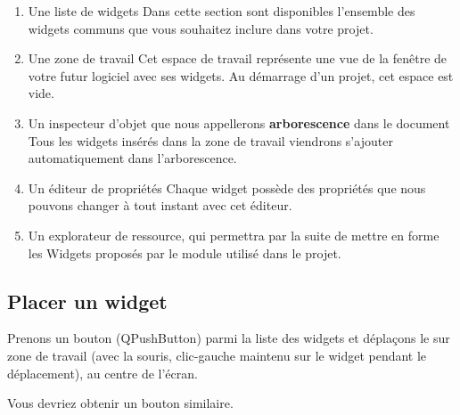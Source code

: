 {\begin{enumerate}

    \item {\color{green}Une liste de widgets}
    Dans cette section sont disponibles l'ensemble des widgets communs que vous souhaitez inclure dans votre projet.

    \item {\color{blue}Une zone de travail}
    Cet espace de travail représente une vue de la fenêtre de votre futur logiciel avec ses widgets. \newline
    Au démarrage d'un projet, cet espace est vide.


    \item {\color{red}Un inspecteur d'objet que nous appellerons \textbf{arborescence} dans le document}
    Tous les widgets insérés dans la zone de travail viendrons s'ajouter automatiquement dans l'arborescence.

    
    \item {\color{magenta}Un éditeur de propriétés}
    Chaque widget possède des propriétés que nous pouvons changer à tout instant avec cet éditeur.

    \item {\color{gray}Un explorateur de ressource}, qui permettra par la suite de mettre en forme les Widgets proposés par le module  utilisé dans le projet.
    
\end{enumerate}


\subsection{Placer un widget}


Prenons un bouton (QPushButton) parmi la {\color{green}liste des widgets} et déplaçons le sur {\color{blue}zone de travail} (avec la souris, clic-gauche maintenu sur le widget pendant le déplacement), au centre de l'écran.




Vous devriez obtenir un bouton similaire. \newline


}
